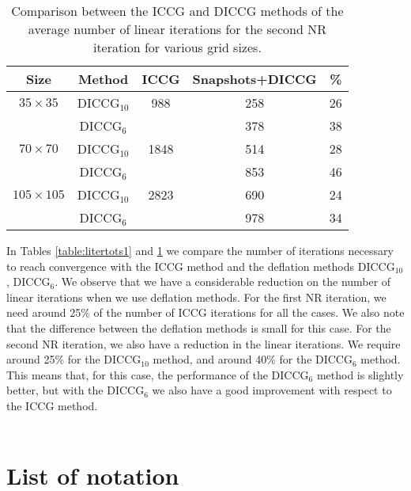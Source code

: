 \documentclass[12pt]{article}
\numberwithin{equation}{section}
\begin{document}
\begin{table}[!ht]
\begin{minipage}{1\textwidth}
\vspace{-10pt}
\centering
\begin{tabular}{ |c|c|c|c|c|} 

\hline
Size&Method& ICCG & Snapshots+DICCG &\% \\
\hline
$35\times35$ &DICCG$_{10}$&988 &258  &26 \\
&DICCG$_6$& & 378 & 38\\
\hline
$70\times70$ &DICCG$_{10}$& 1848& 514 &28 \\
 &DICCG$_6$& &853  &46 \\
\hline
$105\times105$ &DICCG$_{10}$& 2823&690  &24 \\
 &DICCG$_6$& & 978 &34 \\
 \hline
 \end{tabular}
\caption{Comparison between the ICCG and DICCG methods of the average number of linear iterations for the second NR iteration for various grid sizes. }\label{table:litertots2}
\end{minipage}
\end{table}


In Tables \ref{table:litertots1} and \ref{table:litertots2} we compare the number of iterations necessary to reach convergence with the ICCG method and the deflation methods DICCG$_{10}$, DICCG$_6$. We observe that we have a considerable reduction on the number of linear iterations when we use deflation methods. For the first NR iteration, we need around 25\% of the number of ICCG iterations for all the cases. We also note that the difference between the deflation methods is small for this case. For the second NR iteration, we also have a reduction in the linear iterations. We require around 25\% for the DICCG$_{10}$ method, and around 40\% for the DICCG$_6$ method. This means that, for this case, the performance of the DICCG$_6$ method is slightly better, but with the DICCG$_6$ we also have a good improvement with respect to the ICCG method.   \\ \\

\newpage

 
 \newpage
 
% 
\newpage
\newpage
\appendix
\section{List of notation}\label{a1}
\end{document}
